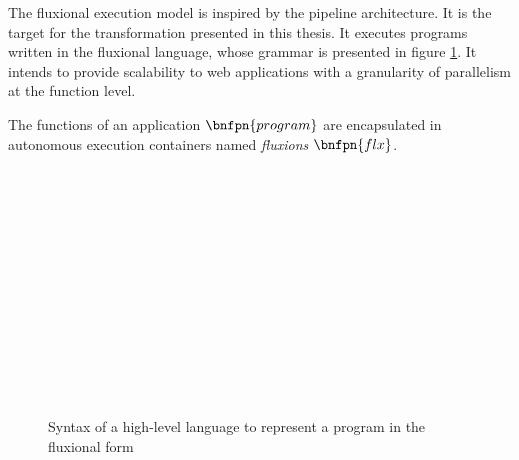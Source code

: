 The fluxional execution model is inspired by the pipeline architecture.
It is the target for the transformation presented in this thesis.
It executes programs written in the fluxional language, whose grammar is presented in figure \ref{fig:flx-lang}.
It intends to provide scalability to web applications with a granularity of parallelism at the function level.

The functions of an application $\bnfpn{program}$ are encapsulated in autonomous execution containers named \textit{fluxions} $\bnfpn{flx}$.

\begin{figure}[h]
\vspace{-0.6\baselineskip}
\begin{bnf*}
      { \bnfor {} \bnfsp {} \bnfsp {}}\\
          { \bnfsp {} \bnfsp {} \bnfsp {} \bnfsp {} \bnfsp {} \bnfsp {} \bnfsp {}}\\
         {\bnfts{\texttt{\&}} \bnfsp {} \bnfor {}}\\
      { \bnfor {} \bnfor {} \bnfsp {} \bnfsp {}}\\
       { \bnfsp {} }\\
         {}\\
          {\bnfts{\texttt{\{}}  \bnfts{\texttt{\}}}}\\
          {\bnfts{\texttt{[}}  \bnfts{\texttt{]}}}\\
         { \bnfor {} \bnfsp \bnfts{,} \bnfsp {}}\\
         {\bnfts{\texttt{>}\texttt{>}} \bnfor \bnfts{\texttt{-}\texttt{>}}}\\
           {}\\
           {  }\\
\end{bnf*}
\vspace{-2.5\baselineskip}
\caption{Syntax of a high-level language to represent a program in the fluxional form}
\label{fig:flx-lang}
\end{figure}



